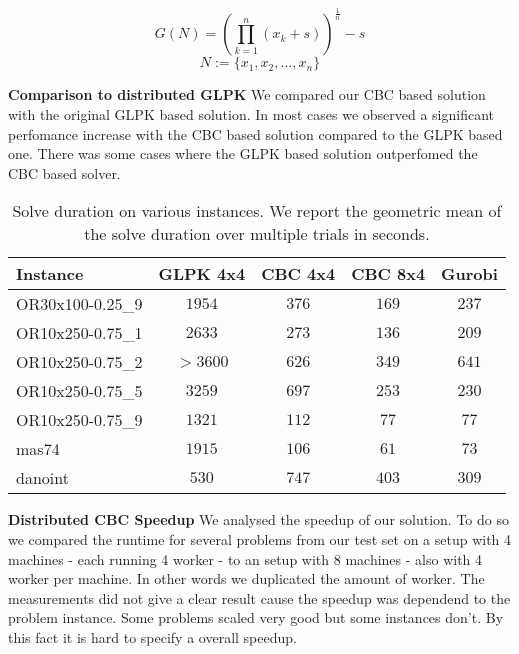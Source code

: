 \documentclass[sigconf]{acmart}
\begin{document}
\[ G(N)=(\prod_{k=1}^n(x_k+s))^{\frac{1}{n}}-s \]
\[  N:=\{x_1,x_2,...,x_n\}\]

\textbf{Comparison to distributed GLPK}
We compared our CBC based solution with the original GLPK based solution. In most cases we observed a significant perfomance increase with the CBC based solution compared to the GLPK based one. There was some cases where the GLPK based solution outperfomed the CBC based solver. 

\begin{table}
\caption{Solve duration on various instances. We report the geometric mean of the solve duration over multiple trials in seconds.}
\begin{tabular}{|l || c |c| c |c|} 
 \hline
 Instance  & GLPK 4x4 & CBC 4x4 & CBC 8x4 &  Gurobi \\  
 \hline\hline
 OR30x100-0.25\_9 & $1954$& $376$ & $169$ & $237$ \\ 
 \hline
  OR10x250-0.75\_1 & $2633$  & $273$ & $136$ & $209$ \\ 
 \hline
  OR10x250-0.75\_2 & $>3600$ & $626$ & $349$ & $641$ \\ 
 \hline 
  OR10x250-0.75\_5 & $3259$ & $697$ & $253$ & $230$\\ 
   \hline
  OR10x250-0.75\_9 & $1321$& $112$ & $77$ & $77$ \\ 
  \hline
   mas74 & $1915$ &  $106$ & $61$&  $73$\\ 
   \hline 
   danoint & $530$ &  $747$ & $403$&$309$\\
   \hline
\end{tabular}
\end{table}

\textbf{Distributed CBC Speedup}
We analysed the speedup of our solution. To do so we compared the runtime for several problems from our test set on a setup with 4 machines - each running 4 worker - to an setup with 8 machines - also with 4 worker per machine. In other words we duplicated the amount of worker. The measurements did not give a clear result cause the speedup was dependend to the problem instance. Some problems scaled very good but some instances don't. By this fact it is hard to specify a overall speedup. 
\end{document}
